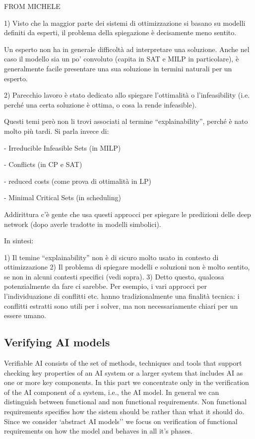 \begin{description}
    {\color{red}FROM MICHELE \tt

      1) Visto che la maggior parte dei sistemi di ottimizzazione si
      basano su modelli definiti da esperti, il problema della
      spiegazione è decisamente meno sentito.

      Un esperto non ha in generale difficoltà ad interpretare una
      soluzione. Anche nel caso il modello sia un po’ convoluto
      (capita in SAT e MILP in particolare), è generalmente facile
      presentare una sua soluzione in termini naturali per un esperto.

      2) Parecchio lavoro è stato dedicato allo spiegare l’ottimalità
      o l’infeasibility (i.e. perché una certa soluzione è ottima, o
      cosa la rende infeasible).

      Questi temi però non li trovi associati al termine
      “explainability”, perché è nato molto più tardi. Si parla invece
      di:

      - Irreducible Infeasible Sets (in MILP)
      
      - Conflicts (in CP e SAT)
      
      - reduced costs (come  prova di ottimalità in LP)
      
      - Minimal Critical Sets (in scheduling)
      

      Addirittura c’è gente che usa questi approcci per spiegare le
      predizioni delle deep network (dopo averle tradotte in modelli
      simbolici).

In sintesi:

1) Il temine “explainability” non è di sicuro molto usato in contesto di ottimizzazione
2) Il problema di  spiegare modelli e soluzioni non è molto sentito, se non in alcuni contesti specifici (vedi sopra).
3) Detto questo, qualcosa potenzialmente da fare ci sarebbe. Per esempio, i vari approcci per l’individuazione di conflitti etc. hanno tradizionalmente una finalità tecnica: i  conflitti estratti sono utili per i solver, ma non necessariamente chiari per un  essere umano.
    }
  \end{description}
  
\subsection{Verifying AI models}
Verifiable AI consists of the set of methods, techniques and tools
that support checking key properties of an AI system or a larger
system that includes AI as one or more key components.  In this part
we concentrate only in the verification of the AI component of a
system, i.e., the AI model. In general we can distinguish between
functional and non functional requirements. Non functional
requirements specifies how the sistem should be rather than what it
should do. Since we consider `abstract AI models'' we focus on
verification of functional requirements on how the model and behaves
in all it's phases. 
  
